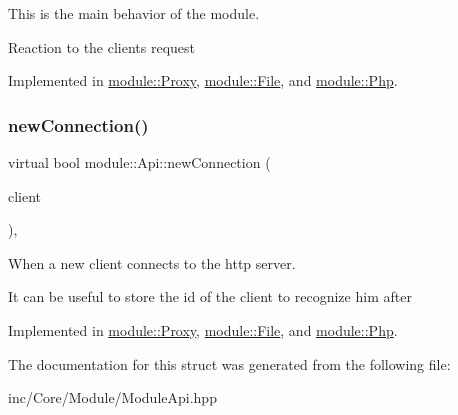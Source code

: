 This is the main behavior of the module. 

Reaction to the client\textquotesingle{}s request 

Implemented in \hyperlink{classmodule_1_1Proxy_a7a210c144da81f379a7ca6b7ef7914c8}{module\+::\+Proxy}, \hyperlink{classmodule_1_1File_a7fceec434dd7b735e08b01a5bd16625b}{module\+::\+File}, and \hyperlink{classmodule_1_1Php_aa73bfe086a0015a892f7d5687639aafb}{module\+::\+Php}.

\mbox{\label{structmodule_1_1Api_aa83ddc92765200dd65f915498175c2be}} 
\subsubsection{\texorpdfstring{new\+Connection()}{newConnection()}}
{\footnotesize\ttfamily virtual bool module\+::\+Api\+::new\+Connection (\begin{DoxyParamCaption}\item[{const \hyperlink{structnet_1_1IClient}{net\+::\+I\+Client} \&}]{client }\end{DoxyParamCaption})\hspace{0.3cm}{\ttfamily [pure virtual]}, {\ttfamily [noexcept]}}



When a new client connects to the http server. 

It can be useful to store the id of the client to recognize him after 

Implemented in \hyperlink{classmodule_1_1Proxy_a92e33605f1164599922fa64d936f5b77}{module\+::\+Proxy}, \hyperlink{classmodule_1_1File_a369f5f98cfbc477e345b7372319737d7}{module\+::\+File}, and \hyperlink{classmodule_1_1Php_adc03ae040e0a938640bd4ba9a6eb2d3c}{module\+::\+Php}.



The documentation for this struct was generated from the following file\+:\begin{DoxyCompactItemize}
\item 
inc/\+Core/\+Module/Module\+Api.\+hpp\end{DoxyCompactItemize}
